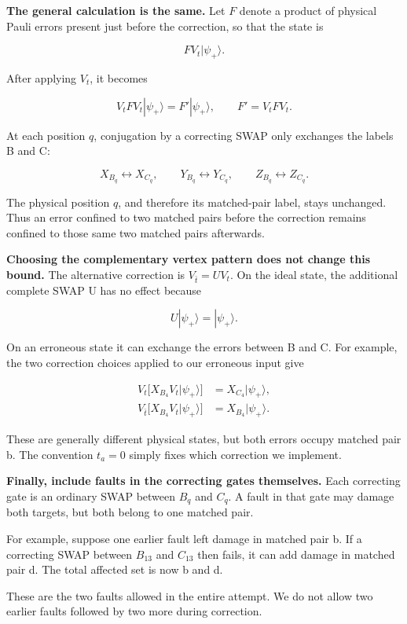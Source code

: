\documentclass[11pt]{article}
\begin{document}
\textbf{The general calculation is the same.} Let \(F\) denote a product of physical Pauli errors present just before the correction, so that the state is

\[
F V_t|\psi_+\rangle.
\]

After applying \(V_t\), it becomes

\[
V_t F V_t|\psi_+\rangle
=F'|\psi_+\rangle,
\qquad
F'=V_t F V_t.
\]

At each position \(q\), conjugation by a correcting SWAP only exchanges the labels B and C:

\[
X_{B_q}\leftrightarrow X_{C_q},\qquad
Y_{B_q}\leftrightarrow Y_{C_q},\qquad
Z_{B_q}\leftrightarrow Z_{C_q}.
\]

The physical position \(q\), and therefore its matched-pair label, stays unchanged. Thus an error confined to two matched pairs before the correction remains confined to those same two matched pairs afterwards.

\textbf{Choosing the complementary vertex pattern does not change this bound.} The alternative correction is \(V_{\bar t}=UV_t\). On the ideal state, the additional complete SWAP U has no effect because

\[
U|\psi_+\rangle=|\psi_+\rangle.
\]

On an erroneous state it can exchange the errors between B and C. For example, the two correction choices applied to our erroneous input give

\[
\begin{aligned}
V_t\bigl[X_{B_4}V_t|\psi_+\rangle\bigr]
&=X_{C_4}|\psi_+\rangle,\\
V_{\bar t}\bigl[X_{B_4}V_t|\psi_+\rangle\bigr]
&=X_{B_4}|\psi_+\rangle.
\end{aligned}
\]

These are generally different physical states, but both errors occupy matched pair b. The convention \(t_a=0\) simply fixes which correction we implement.

\textbf{Finally, include faults in the correcting gates themselves.} Each correcting gate is an ordinary SWAP between \(B_q\) and \(C_q\). A fault in that gate may damage both targets, but both belong to one matched pair.

For example, suppose one earlier fault left damage in matched pair b. If a correcting SWAP between \(B_{13}\) and \(C_{13}\) then fails, it can add damage in matched pair d. The total affected set is now b and d.

These are the two faults allowed in the entire attempt. We do not allow two earlier faults followed by two more during correction.
\end{document}
